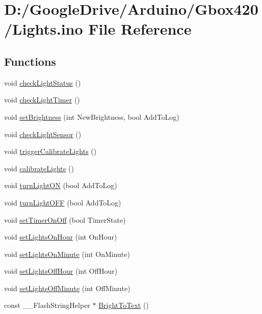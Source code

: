 \hypertarget{_lights_8ino}{}\section{D\+:/\+Google\+Drive/\+Arduino/\+Gbox420/\+Lights.ino File Reference}
\label{_lights_8ino}
\subsection*{Functions}
\begin{DoxyCompactItemize}
\item 
void \mbox{\hyperlink{_lights_8ino_ab05125e73b9f49ea49ab69c9d76b6cd6}{check\+Light\+Status}} ()
\item 
void \mbox{\hyperlink{_lights_8ino_a76c1c1e7fa1dc6cea6562fc6cc852b76}{check\+Light\+Timer}} ()
\item 
void \mbox{\hyperlink{_lights_8ino_a81dbf7c6038727c457cffdc631f93231}{set\+Brightness}} (int New\+Brightness, bool Add\+To\+Log)
\item 
void \mbox{\hyperlink{_lights_8ino_af28e0ef82a157e0bc303dac9c1232f57}{check\+Light\+Sensor}} ()
\item 
void \mbox{\hyperlink{_lights_8ino_a19b4105316888247ed0b361793002319}{trigger\+Calibrate\+Lights}} ()
\item 
void \mbox{\hyperlink{_lights_8ino_aa2d3f5af576920b8e8db627d2649f5ac}{calibrate\+Lights}} ()
\item 
void \mbox{\hyperlink{_lights_8ino_afe20e2cb268c3ba2aa41e9d99cbae9dc}{turn\+Light\+ON}} (bool Add\+To\+Log)
\item 
void \mbox{\hyperlink{_lights_8ino_a221195d6aa942e54a2638ae739dee8ed}{turn\+Light\+O\+FF}} (bool Add\+To\+Log)
\item 
void \mbox{\hyperlink{_lights_8ino_a6c067cff06262537a37378bb1b6e9c1c}{set\+Timer\+On\+Off}} (bool Timer\+State)
\item 
void \mbox{\hyperlink{_lights_8ino_aeb59b268327c0d96bb1588204f035d3f}{set\+Lights\+On\+Hour}} (int On\+Hour)
\item 
void \mbox{\hyperlink{_lights_8ino_abcc7306705a29bd99aeced1bbc6db3ef}{set\+Lights\+On\+Minute}} (int On\+Minute)
\item 
void \mbox{\hyperlink{_lights_8ino_a943802e11b0549a6bf850c91bdc7bdeb}{set\+Lights\+Off\+Hour}} (int Off\+Hour)
\item 
void \mbox{\hyperlink{_lights_8ino_a45f6e552ef9305406dfee593a6ee1ca3}{set\+Lights\+Off\+Minute}} (int Off\+Minute)
\item 
const \+\_\+\+\_\+\+Flash\+String\+Helper $\ast$ \mbox{\hyperlink{_lights_8ino_adbfc7454808549ff8d9be0ac5e1e004a}{Bright\+To\+Text}} ()
\end{DoxyCompactItemize}
